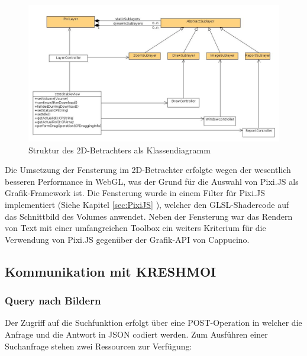 \begin{figure}[t]
	\centering
		\includegraphics[width=\linewidth]{img/s3_2dview_class_structure.jpg}
	\caption{Struktur des 2D-Betrachters als Klassendiagramm}
	\label{fig:omip_klass_layout}
\end{figure}

Die Umsetzung der Fensterung im 2D-Betrachter erfolgte wegen der wesentlich besseren Performance in WebGL, 
was der Grund für die Auswahl von Pixi.JS als Grafik-Framework ist.
Die Fensterung wurde in einem Filter für Pixi.JS implementiert (Siehe Kapitel \ref{sec:PixiJS} ), welcher den GLSL-Shadercode auf das Schnittbild des Volumes anwendet.
Neben der Fensterung war das Rendern von Text mit einer umfangreichen Toolbox ein weiters Kriterium für die Verwendung von Pixi.JS gegenüber der Grafik-API von Cappucino.


\subsection{Kommunikation mit KRESHMOI}
\label{sec:Kommunikation mit KRESHMOI}

\subsubsection{Query nach Bildern}
\label{sec:Query nach Bildern}
Der Zugriff auf die Suchfunktion erfolgt über eine POST-Operation in welcher die Anfrage und die Antwort in JSON codiert werden.
Zum Ausführen einer Suchanfrage stehen zwei Ressourcen zur Verfügung:
%
